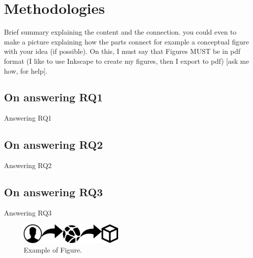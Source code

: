 \section{Methodologies}
\label{sec:methodologies}

Brief summary explaining the content and the connection.
you could even to make a picture explaining how the parts connect for example a conceptual figure with your idea (if possible).
On this, I must say that Figures MUST be in pdf format (I like to use Inkscape to create my figures, then I export to pdf) [ask me how, for help].

\subsection{On answering RQ1}
\label{subsec:on-answering-rq1}
Answering RQ1

\subsection{On answering RQ2}
\label{subsec:on-answering-rq2}
Answering RQ2

\subsection{On answering RQ3}
\label{subsec:on-answering-rq3}
Answering RQ3

\begin{figure}[h!]
	\label{fig:figure}
	\centering
	\includegraphics[width=0.45\textwidth]{figs/example}
	\caption{Example of Figure.}
\end{figure}